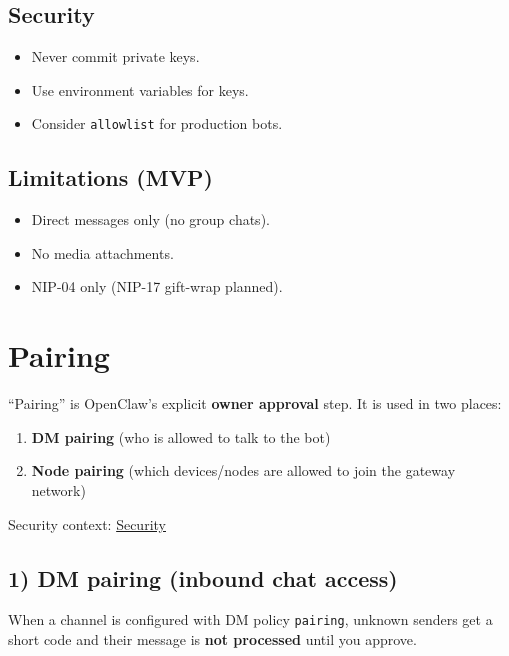 \subsection{Security}


\begin{itemize}
  \item Never commit private keys.
  \item Use environment variables for keys.
  \item Consider \texttt{allowlist} for production bots.
\end{itemize}


\subsection{Limitations (MVP)}


\begin{itemize}
  \item Direct messages only (no group chats).
  \item No media attachments.
  \item NIP-04 only (NIP-17 gift-wrap planned).
\end{itemize}



\clearpage

\section{Pairing}


“Pairing” is OpenClaw’s explicit \textbf{owner approval} step.
It is used in two places:

\begin{enumerate}
  \item \textbf{DM pairing} (who is allowed to talk to the bot)
  \item \textbf{Node pairing} (which devices/nodes are allowed to join the gateway network)
\end{enumerate}


Security context: \href{/gateway/security}{Security}

\subsection{1) DM pairing (inbound chat access)}


When a channel is configured with DM policy \texttt{pairing}, unknown senders get a short code and their message is \textbf{not processed} until you approve.

